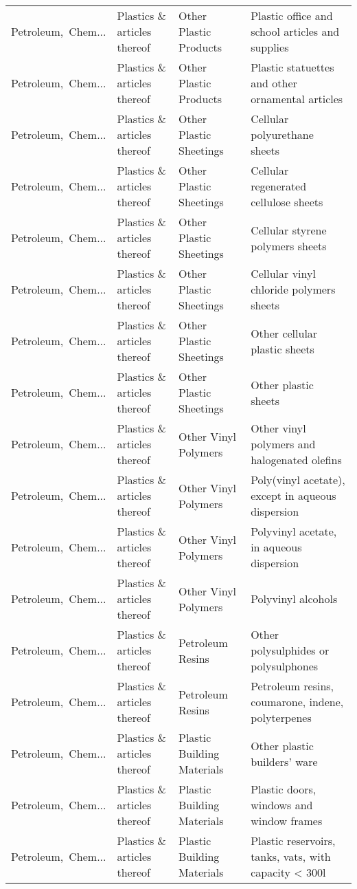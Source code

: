 \begin{appendices}
\begin{xltabular}{\textwidth}{|p{0.10\textwidth}|p{0.25\textwidth}|p{0.24\textwidth}|p{0.31\textwidth}|}
Petroleum,\ Chem... & Plastics \& articles thereof & Other Plastic Products & Plastic office and school articles and supplies \\
Petroleum,\ Chem... & Plastics \& articles thereof & Other Plastic Products & Plastic statuettes and other ornamental articles \\
Petroleum,\ Chem... & Plastics \& articles thereof & Other Plastic Sheetings & Cellular polyurethane sheets \\
Petroleum,\ Chem... & Plastics \& articles thereof & Other Plastic Sheetings & Cellular regenerated cellulose sheets \\
Petroleum,\ Chem... & Plastics \& articles thereof & Other Plastic Sheetings & Cellular styrene polymers sheets \\
Petroleum,\ Chem... & Plastics \& articles thereof & Other Plastic Sheetings & Cellular vinyl chloride polymers sheets \\
Petroleum,\ Chem... & Plastics \& articles thereof & Other Plastic Sheetings & Other cellular plastic sheets \\
Petroleum,\ Chem... & Plastics \& articles thereof & Other Plastic Sheetings & Other plastic sheets \\
Petroleum,\ Chem... & Plastics \& articles thereof & Other Vinyl Polymers & Other vinyl polymers and halogenated olefins \\
Petroleum,\ Chem... & Plastics \& articles thereof & Other Vinyl Polymers & Poly(vinyl acetate), except in aqueous dispersion \\
Petroleum,\ Chem... & Plastics \& articles thereof & Other Vinyl Polymers & Polyvinyl acetate, in aqueous dispersion \\
Petroleum,\ Chem... & Plastics \& articles thereof & Other Vinyl Polymers & Polyvinyl alcohols \\
Petroleum,\ Chem... & Plastics \& articles thereof & Petroleum Resins & Other polysulphides or polysulphones \\
Petroleum,\ Chem... & Plastics \& articles thereof & Petroleum Resins & Petroleum resins, coumarone, indene, polyterpenes \\
Petroleum,\ Chem... & Plastics \& articles thereof & Plastic Building Materials & Other plastic builders' ware \\
Petroleum,\ Chem... & Plastics \& articles thereof & Plastic Building Materials & Plastic doors, windows and window frames \\
Petroleum,\ Chem... & Plastics \& articles thereof & Plastic Building Materials & Plastic reservoirs, tanks, vats, with capacity < 300l \\

\end{xltabular}
\end{appendices}
